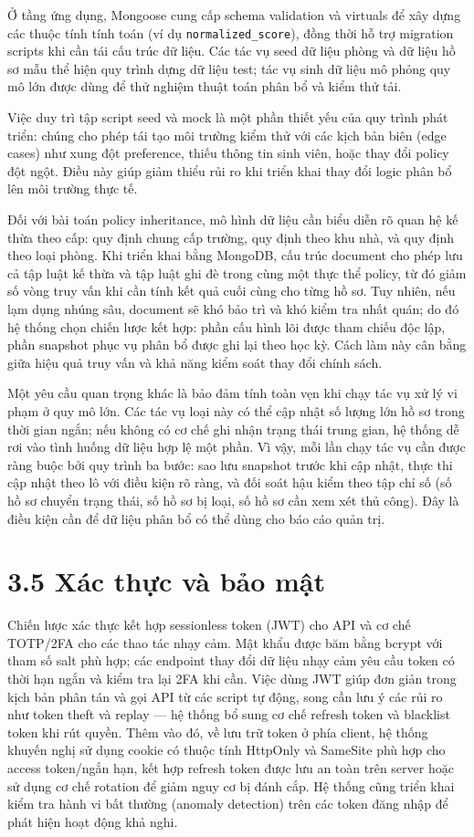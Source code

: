\documentclass[a4paper,12pt,openany,oneside]{report}
\begin{document}
Ở tầng ứng dụng, Mongoose cung cấp schema validation và virtuals để xây dựng các thuộc tính tính toán (ví dụ \texttt{normalized\_score}), đồng thời hỗ trợ migration scripts khi cần tái cấu trúc dữ liệu. Các tác vụ seed dữ liệu phòng và dữ liệu hồ sơ mẫu thể hiện quy trình dựng dữ liệu test; tác vụ sinh dữ liệu mô phỏng quy mô lớn được dùng để thử nghiệm thuật toán phân bổ và kiểm thử tải.

Việc duy trì tập script seed và mock là một phần thiết yếu của quy trình phát triển: chúng cho phép tái tạo môi trường kiểm thử với các kịch bản biên (edge cases) như xung đột preference, thiếu thông tin sinh viên, hoặc thay đổi policy đột ngột. Điều này giúp giảm thiểu rủi ro khi triển khai thay đổi logic phân bổ lên môi trường thực tế.

Đối với bài toán policy inheritance, mô hình dữ liệu cần biểu diễn rõ quan hệ kế thừa theo cấp: quy định chung cấp trường, quy định theo khu nhà, và quy định theo loại phòng. Khi triển khai bằng MongoDB, cấu trúc document cho phép lưu cả tập luật kế thừa và tập luật ghi đè trong cùng một thực thể policy, từ đó giảm số vòng truy vấn khi cần tính kết quả cuối cùng cho từng hồ sơ. Tuy nhiên, nếu lạm dụng nhúng sâu, document sẽ khó bảo trì và khó kiểm tra nhất quán; do đó hệ thống chọn chiến lược kết hợp: phần cấu hình lõi được tham chiếu độc lập, phần snapshot phục vụ phân bổ được ghi lại theo học kỳ. Cách làm này cân bằng giữa hiệu quả truy vấn và khả năng kiểm soát thay đổi chính sách.

Một yêu cầu quan trọng khác là bảo đảm tính toàn vẹn khi chạy tác vụ xử lý vi phạm ở quy mô lớn. Các tác vụ loại này có thể cập nhật số lượng lớn hồ sơ trong thời gian ngắn; nếu không có cơ chế ghi nhận trạng thái trung gian, hệ thống dễ rơi vào tình huống dữ liệu hợp lệ một phần. Vì vậy, mỗi lần chạy tác vụ cần được ràng buộc bởi quy trình ba bước: sao lưu snapshot trước khi cập nhật, thực thi cập nhật theo lô với điều kiện rõ ràng, và đối soát hậu kiểm theo tập chỉ số (số hồ sơ chuyển trạng thái, số hồ sơ bị loại, số hồ sơ cần xem xét thủ công). Đây là điều kiện cần để dữ liệu phân bổ có thể dùng cho báo cáo quản trị.

\section*{3.5 Xác thực và bảo mật}
Chiến lược xác thực kết hợp sessionless token (JWT) cho API và cơ chế TOTP/2FA cho các thao tác nhạy cảm. Mật khẩu được băm bằng bcrypt với tham số salt phù hợp; các endpoint thay đổi dữ liệu nhạy cảm yêu cầu token có thời hạn ngắn và kiểm tra lại 2FA khi cần. Việc dùng JWT giúp đơn giản trong kịch bản phân tán và gọi API từ các script tự động, song cần lưu ý các rủi ro như token theft và replay — hệ thống bổ sung cơ chế refresh token và blacklist token khi rút quyền.
Thêm vào đó, về lưu trữ token ở phía client, hệ thống khuyến nghị sử dụng cookie có thuộc tính HttpOnly và SameSite phù hợp cho access token/ngắn hạn, kết hợp refresh token được lưu an toàn trên server hoặc sử dụng cơ chế rotation để giảm nguy cơ bị đánh cắp. Hệ thống cũng triển khai kiểm tra hành vi bất thường (anomaly detection) trên các token đăng nhập để phát hiện hoạt động khả nghi.
\end{document}
